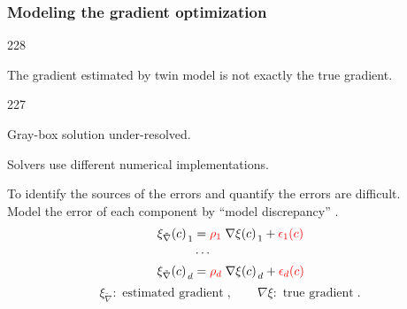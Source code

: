 \documentclass{beamer}
\let\oldcite=\cite
\renewcommand{\cite}[1]{\textcolor[rgb]{.4,.4,.85}{\oldcite{#1}}}
\newcommand{\barrow}{\item[\color{darkred}\ding{228}]}
\newcommand{\carrow}{\item[\color{darkred}\ding{227}]}
\begin{document}
\begin{frame}
    \frametitle{Modeling the gradient \hfill \scriptsize{optimization}}\small
    \begin{dinglist}{228}
        \barrow The gradient estimated by twin model is not exactly the true gradient.\\
            \vspace{.2cm}
            \begin{dinglist}{227}
                \carrow Gray-box solution under-resolved.\\
                \vspace{.2cm}
                \carrow Solvers use different numerical implementations.\\
            \end{dinglist}
        \vspace{.3cm}
        \barrow To identify the sources of the errors and quantify the errors are difficult.\\
                Model the error of each component by ``model discrepancy'' \scriptsize 
              \cite{Kennedy 01, Higdon 04}.\small
              \begin{equation*}\begin{split}
                  \left.\xi_{\tilde{\nabla}}(c)\right._1 
                  &= \textcolor{red}{\rho_1} \left. \nabla \xi(c)\right._1 + 
                    \textcolor{red}{\mathbf{\epsilon}_1(c)}\\
                  &\cdots\\
                  \left.\xi_{\tilde{\nabla}}(c)\right._d
                  &= \textcolor{red}{\rho_d }\left. \nabla \xi(c)\right._d + 
                  \textcolor{red}{\mathbf{\epsilon}_d(c)}
              \end{split}\end{equation*}
              \begin{equation*}
                  \xi_{\tilde{\nabla}}: \textrm{ estimated gradient}\;,\qquad
                  \nabla \xi: \textrm{ true gradient}\;.
              \end{equation*}
    \end{dinglist}
\end{frame}
\end{document}
